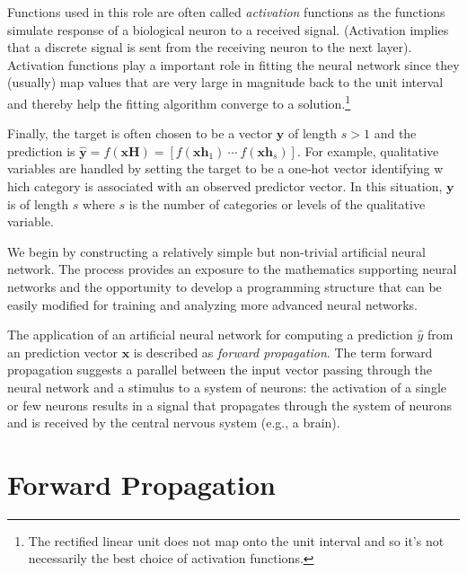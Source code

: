 \documentclass[graybox,envcountchap]{svmono}
\newcommand{\hf}{\mathbf{h}}
\newcommand{\xf}{\mathbf{x}}
\newcommand{\yf}{\mathbf{y}}
\newcommand{\nn}{neural network}
\newcommand{\w}{\widehat}
\begin{document}
Functions used in this role are often called \emph{activation} functions as the functions simulate response of a biological neuron to a received signal.  (Activation implies that a discrete signal is sent from the receiving neuron to the next layer). Activation functions play a important role in fitting the {\nn } since they (usually) map values that are very large in magnitude back to the unit interval and thereby help the fitting algorithm converge to a solution.\footnote{The rectified linear unit does not map onto the unit interval and so it's not necessarily the best choice of activation functions.}

Finally, the target is often chosen to be a vector $\yf$ of length $s> 1$ and the prediction is $\w{\yf} = f(\xf \mathbf{H} ) = [f(\xf \hf_1 ) \ \cdots \ f( \xf \hf_s )]$. For example, qualitative variables are handled by setting the target to be a one-hot vector identifying w hich category is associated with an observed predictor vector. In this situation, $\yf$ is of length $s$ where $s$ is the number of categories or levels of the qualitative variable.

We begin by constructing a relatively simple but non-trivial artificial  \nn.  The process provides an exposure to the mathematics supporting \nn s and the opportunity to develop a programming structure that can be easily modified for training and analyzing more advanced \nn s. 

The application of an artificial {\nn } for computing a prediction $\w{y}$ from an prediction vector $\xf$ is described as \emph{forward propagation}. The term forward propagation suggests a parallel between the input vector passing through the {\nn } and a stimulus to a system of neurons: the activation of a single or few neurons results in a signal that propagates through the system of neurons and is received by the central nervous system (e.g., a brain).

\section{Forward Propagation}\label{section:forwardProp}
\end{document}

